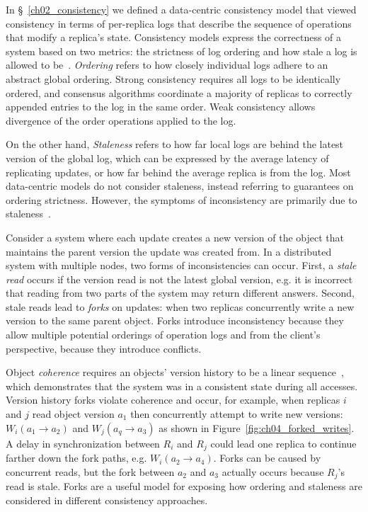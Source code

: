 In \S~\ref{ch02_consistency} we defined a data-centric consistency model that viewed consistency in terms of per-replica logs that describe the sequence of operations that modify a replica's state.
Consistency models express the correctness of a system based on two metrics: the strictness of log ordering and how stale a log is allowed to be~\cite{bermbach_consistency_2013}.
\emph{Ordering} refers to how closely individual logs adhere to an abstract global ordering.
Strong consistency requires all logs to be identically ordered, and consensus algorithms coordinate a majority of replicas to correctly appended entries to the log in the same order.
Weak consistency allows divergence of the order operations applied to the log.

On the other hand, \emph{Staleness} refers to how far local logs are behind the latest version of the global log, which can be expressed by the average latency of replicating updates, or how far behind the average replica is from the log.
Most data-centric models do not consider staleness, instead referring to guarantees on ordering strictness.
However, the symptoms of inconsistency are primarily due to staleness~\cite{probabilistically_bounded_staleness,quantifying_pbs}.

Consider a system where each update creates a new version of the object that maintains the parent version the update was created from.
In a distributed system with multiple nodes, two forms of inconsistencies can occur.
First, a \emph{stale read} occurs if the version read is not the latest global version, e.g. it is incorrect that reading from two parts of the system may return different answers.
Second, stale reads lead to \emph{forks} on updates: when two replicas concurrently write a new version to the same parent object.
Forks introduce inconsistency because they allow multiple potential orderings of operation logs and from the client's perspective, because they introduce conflicts.

Object \emph{coherence} requires an objects' version history to be a linear sequence~\cite{rethinking_eventual}, which demonstrates that the
system was in a consistent state during all accesses.
Version history forks violate coherence and occur, for example, when replicas $i$ and $j$ read object version $a_1$ then concurrently attempt to write new versions: $W_i(a_1 \rightarrow a_2)$ and $W_j(a_q \rightarrow a_3)$ as shown in Figure~\ref{fig:ch04_forked_writes}.
A delay in synchronization between $R_i$ and $R_j$ could lead one replica to continue farther down the fork paths, e.g. $W_i(a_2 \rightarrow a_4)$.
Forks can be caused by concurrent reads, but the fork between $a_2$ and $a_3$ actually occurs because $R_j$'s read is stale.
Forks are a useful model for exposing how ordering and staleness are considered in different consistency approaches.

